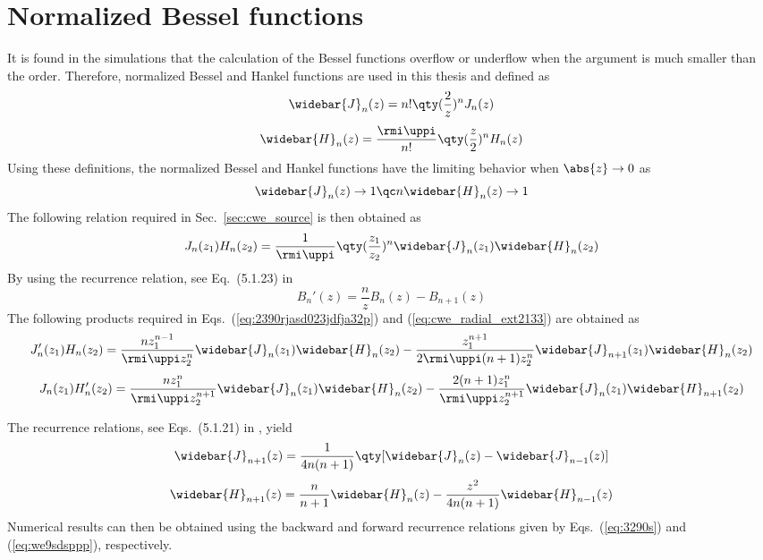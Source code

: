 \section{Normalized Bessel functions}
It is found in the simulations that the calculation of the Bessel functions overflow or underflow when the argument is much smaller than the order. Therefore, normalized Bessel and Hankel functions are used in this thesis and defined as
\begin{equation}
    \widebar{J}_n(z)
   =n!\qty(\frac{2}{z})^n J_n(z)
\end{equation}
\begin{equation}
    \widebar{H}_n(z) = \frac{\rmi \uppi}{n!}\qty(\frac{z}{2})^n H_n(z)
\end{equation}
Using these definitions, the normalized Bessel and Hankel functions have the limiting behavior when $\abs{z} \to 0$ as
\begin{equation}
    \widebar{J}_n(z) \to 1
    \qc
    n\widebar{H}_n(z)\to1
\end{equation}
The following relation required in Sec.~\ref{sec:cwe_source} is then obtained as
\begin{equation}
    J_n(z_1)H_n(z_2)
    = 
    \frac{1}{\rmi \uppi}
    \qty(\frac{z_1}{z_2})^n
    \widebar{J}_n(z_1)
    \widebar{H}_n(z_2)
\end{equation}
By using the recurrence relation, see Eq.~(5.1.23) in \cite{Zhang1996ComputationSpecialFunctions}
\begin{equation}
    B_n'(z) = \frac{n}{z}B_n(z) - B_{n+1}(z)
    \label{eq:2389f90ed9f2}
\end{equation}
The following products required in Eqs.~(\ref{eq:2390rjasd023jdfja32p}) and (\ref{eq:cwe_radial_ext2133}) are obtained as
\begin{equation}
    J'_n(z_1)H_n(z_2) = 
    \frac{nz_1^{n-1}}{\rmi \uppi z_2^n}
    \widebar{J}_n(z_1)\widebar{H}_n(z_2)
    -
    \frac{z_1^{n+1}}{2\rmi \uppi (n+1)z_2^n}
    \widebar{J}_{n+1}(z_1)
    \widebar{H}_n (z_2)
    \label{eq:2389r89uujj}
\end{equation}
\begin{equation}
    J_n(z_1)H_n'(z_2)
    =
    \frac{n z_1^n}{\rmi \uppi z_2^{n+1}} 
    \widebar{J}_n(z_1)
    \widebar{H}_n(z_2)
    - \frac{2(n+1)z_1^n}{\rmi \uppi z_2^{n+1}}
    \widebar{J}_n(z_1)
    \widebar{H}_{n+1}(z_2)
    \label{eq:2898989999}
\end{equation}

The recurrence relations, see Eqs.~(5.1.21) in \cite{Zhang1996ComputationSpecialFunctions}, yield
\begin{equation}
    \widebar{J}_{n+1}(z)
    =
    \frac{1}{4n(n+1)}
    \qty[\widebar{J}_n(z)- \widebar{J}_{n-1}(z)]
    \label{eq:3290s}
\end{equation}
\begin{equation}
    \widebar{H}_{n+1}(z)
    = 
    \frac{n}{n+1}\widebar{H}_n(z)
    -\frac{z^2}{4n(n+1)} \widebar{H}_{n-1}(z)
    \label{eq:we9sdsppp}
\end{equation}
Numerical results can then be obtained using the backward and forward recurrence relations given by Eqs.~(\ref{eq:3290s}) and (\ref{eq:we9sdsppp}), respectively.

